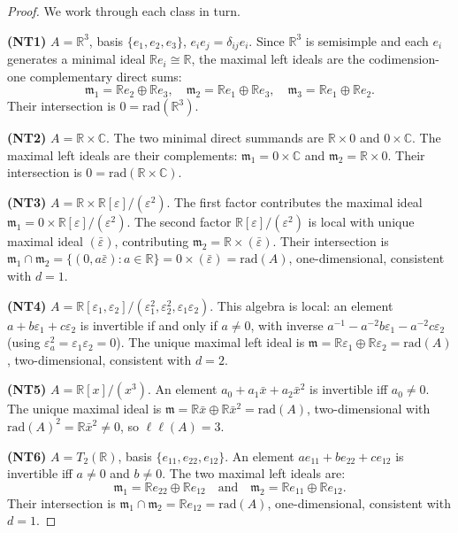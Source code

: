\documentclass[10pt,a4paper]{amsart}
\newcommand{\CC}{\mathbb{C}}
\newcommand{\Jac}{\mathrm{rad}}
\newcommand{\LL}{\ell\ell}
\newcommand{\RR}{\mathbb{R}}
\begin{document}
\begin{proof}
We work through each class in turn.

\smallskip\noindent
\textbf{(NT1)} $A = \RR^3$, basis $\{e_1, e_2, e_3\}$, $e_ie_j = \delta_{ij}e_i$.
Since $\RR^3$ is semisimple and each $e_i$ generates a minimal ideal
$\RR e_i \cong \RR$, the maximal left ideals are the codimension-one
complementary direct sums:
\[
  \mathfrak{m}_1 = \RR e_2 \oplus \RR e_3,\quad
  \mathfrak{m}_2 = \RR e_1 \oplus \RR e_3,\quad
  \mathfrak{m}_3 = \RR e_1 \oplus \RR e_2.
\]
Their intersection is $0 = \Jac(\RR^3)$.

\smallskip\noindent
\textbf{(NT2)} $A = \RR \times \CC$.
The two minimal direct summands are $\RR \times 0$ and $0 \times \CC$.
The maximal left ideals are their complements:
$\mathfrak{m}_1 = 0 \times \CC$ and $\mathfrak{m}_2 = \RR \times 0$.
Their intersection is $0 = \Jac(\RR \times \CC)$.

\smallskip\noindent
\textbf{(NT3)} $A = \RR \times \RR[\varepsilon]/(\varepsilon^2)$.
The first factor contributes the maximal ideal
$\mathfrak{m}_1 = 0 \times \RR[\varepsilon]/(\varepsilon^2)$.
The second factor $\RR[\varepsilon]/(\varepsilon^2)$ is local with
unique maximal ideal $(\bar\varepsilon)$, contributing
$\mathfrak{m}_2 = \RR \times (\bar\varepsilon)$.
Their intersection is
$\mathfrak{m}_1 \cap \mathfrak{m}_2
 = \{(0, a\bar\varepsilon) : a \in \RR\}
 = 0 \times (\bar\varepsilon) = \Jac(A)$,
one-dimensional, consistent with $d = 1$.

\smallskip\noindent
\textbf{(NT4)} $A = \RR[\varepsilon_1, \varepsilon_2]/(\varepsilon_1^2, \varepsilon_2^2, \varepsilon_1 \varepsilon_2)$.
This algebra is local: an element $a + b\varepsilon_1 + c\varepsilon_2$ is invertible
if and only if $a \neq 0$, with inverse
$a^{-1} - a^{-2}b\varepsilon_1 - a^{-2}c\varepsilon_2$ (using $\varepsilon_a^2 = \varepsilon_1 \varepsilon_2 = 0$).
The unique maximal left ideal is
$\mathfrak{m} = \RR \varepsilon_1 \oplus \RR \varepsilon_2 = \Jac(A)$,
two-dimensional, consistent with $d = 2$.

\smallskip\noindent
\textbf{(NT5)} $A = \RR[x]/(x^3)$.
An element $a_0 + a_1\bar x + a_2\bar x^2$ is invertible iff $a_0 \neq 0$.
The unique maximal ideal is
$\mathfrak{m} = \RR\bar x \oplus \RR\bar x^2 = \Jac(A)$,
two-dimensional with $\Jac(A)^2 = \RR\bar x^2 \neq 0$, so $\LL(A) = 3$.

\smallskip\noindent
\textbf{(NT6)} $A = T_2(\RR)$, basis $\{e_{11}, e_{22}, e_{12}\}$.
An element $ae_{11} + be_{22} + ce_{12}$ is invertible iff $a \neq 0$
and $b \neq 0$.
The two maximal left ideals are:
\[
  \mathfrak{m}_1 = \RR e_{22} \oplus \RR e_{12}
  \quad\text{and}\quad
  \mathfrak{m}_2 = \RR e_{11} \oplus \RR e_{12}.
\]
Their intersection is
$\mathfrak{m}_1 \cap \mathfrak{m}_2 = \RR e_{12} = \Jac(A)$,
one-dimensional, consistent with $d = 1$.
\end{proof}
\end{document}
